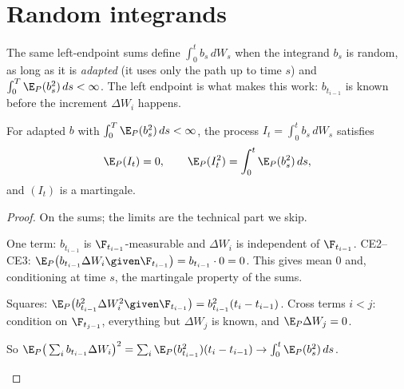 \begin{pic}
\end{pic}

\section{Random integrands}

The same left-endpoint sums define $\int_0^tb_s\,dW_s$ when the integrand $b_s$ is random, as long as it is \emph{adapted} (it uses only the path up to time $s$) and $\int_0^T\E_P(b_s^2)\,ds<\infty$. The left endpoint is what makes this work: $b_{t_{i-1}}$ is known before the increment $\Delta W_i$ happens.

\begin{theorem}
\label{thm:ito-mg}
For adapted $b$ with $\int_0^T\E_P(b_s^2)\,ds<\infty$, the process $I_t=\int_0^tb_s\,dW_s$ satisfies
\[
  \E_P(I_t)=0,\qquad \E_P(I_t^2)=\int_0^t\E_P(b_s^2)\,ds,
\]
and $(I_t)$ is a martingale.
\end{theorem}
\begin{proof}
On the sums; the limits are the technical part we skip.
\begin{steps}
  \item One term: $b_{t_{i-1}}$ is $\F_{t_{i-1}}$-measurable and $\Delta W_i$ is independent of $\F_{t_{i-1}}$. CE2--CE3: $\E_P\big(b_{t_{i-1}}\Delta W_i\given\F_{t_{i-1}}\big)=b_{t_{i-1}}\cdot0=0$. This gives mean $0$ and, conditioning at time $s$, the martingale property of the sums.
  \item Squares: $\E_P\big(b_{t_{i-1}}^2\Delta W_i^2\given\F_{t_{i-1}}\big)=b_{t_{i-1}}^2(t_i-t_{i-1})$. Cross terms $i<j$: condition on $\F_{t_{j-1}}$, everything but $\Delta W_j$ is known, and $\E_P\Delta W_j=0$.
  \item So $\E_P\big(\sum_ib_{t_{i-1}}\Delta W_i\big)^2=\sum_i\E_P(b_{t_{i-1}}^2)(t_i-t_{i-1})\to\int_0^t\E_P(b_s^2)\,ds$. \qedhere
\end{steps}
\end{proof}

